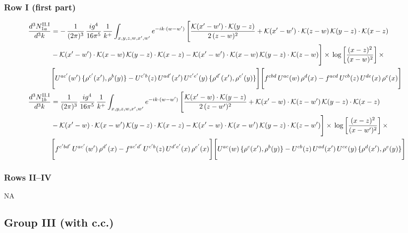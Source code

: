 \documentclass[9pt]{article}
\numberwithin{equation}{section}
\begin{document}
\subsubsection*{Row I (first part)}
\begin{align}
\frac{d^{3}N^{\rm II.I}_{1a}}{d^{3}k} & = -\,\frac{1}{(2\pi)^{3}}\,\frac{ig^{4}}{16\pi^{5}}\,\frac{1}{k^{+}}\int_{x,y,z,w,x',w'} e^{-ik\cdot(w-w')}\,\Bigg[\frac{\mathcal{K}(x'-w')\cdot\mathcal{K}(y-z)}{2\,(z-w)^{2}}+\mathcal{K}(x'-w')\cdot\mathcal{K}(z-w)\,\mathcal{K}(y-z)\cdot\mathcal{K}(x-z)\notag \\ & -\mathcal{K}(x'-w')\cdot\mathcal{K}(x-w)\,\mathcal{K}(y-z)\cdot\mathcal{K}(x-z)-\mathcal{K}(x'-w')\cdot\mathcal{K}(x-w)\,\mathcal{K}(y-z)\cdot\mathcal{K}(z-w)\Bigg]\times\,\log\left[\frac{(x-z)^{2}}{(x-w)^{2}}\right]\times\,\notag \\
&\Bigg[U^{ac'}(w')\,\{\rho^{c'}(x'),\rho^{b}(y)\}-U^{c'b}(z)\,U^{ad'}(x')\,U^{c'e'}(y)\,\{\rho^{d'}(x'),\rho^{e'}(y)\}\Bigg]\Bigg[f^{cbd}\,U^{ac}(w)\,\rho^{d}(x)-f^{acd}\,U^{cb}(z)\,U^{de}(x)\,\rho^{e}(x)\Bigg]\label{eq:B-II1a}\\
\frac{d^{3}N^{\rm II.I}_{1b}}{d^{3}k} & = \frac{1}{(2\pi)^{3}}\,\frac{ig^{4}}{16\pi^{5}}\,\frac{1}{k^{+}}\int_{x,y,z,w,x',w'} e^{-ik\cdot(w-w')}\,\Bigg[\frac{\mathcal{K}(x'-w)\cdot\mathcal{K}(y-z)}{2\,(z-w')^{2}}+\mathcal{K}(x'-w)\cdot\mathcal{K}(z-w')\,\mathcal{K}(y-z)\cdot\mathcal{K}(x-z)\notag \\ & -\mathcal{K}(x'-w)\cdot\mathcal{K}(x-w')\,\mathcal{K}(y-z)\cdot\mathcal{K}(x-z)-\mathcal{K}(x'-w)\cdot\mathcal{K}(x-w')\,\mathcal{K}(y-z)\cdot\mathcal{K}(z-w')\Bigg]\times\,\log\left[\frac{(x-z)^{2}}{(x-w')^{2}}\right]\times\,\notag \\
&\Bigg[f^{c'bd'}\,U^{ac'}(w')\,\rho^{d'}(x)-f^{ac'd'}\,U^{c'b}(z)\,U^{d'e'}(x)\,\rho^{e'}(x)\Bigg]\Bigg[U^{ac}(w)\,\{\rho^{c}(x'),\rho^{b}(y)\}-U^{cb}(z)\,U^{ad}(x')\,U^{ce}(y)\,\{\rho^{d}(x'),\rho^{e}(y)\}\Bigg]\label{eq:B-II1b}
\end{align}
\subsubsection*{Rows II--IV} \textsc{NA}
\subsection{Group III (with c.c.)}
\end{document}
